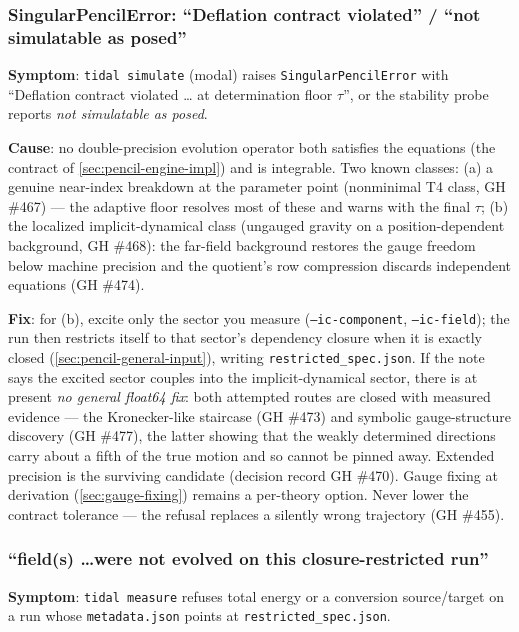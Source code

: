 \subsubsection{SingularPencilError: ``Deflation contract violated'' / ``not simulatable as posed''}
\label{sec:troubleshooting-pencil-refusal}

\textbf{Symptom}: \texttt{tidal simulate} (modal) raises
\texttt{SingularPencilError} with ``Deflation contract violated \ldots
at determination floor $\tau$'', or the stability probe reports
\emph{not simulatable as posed}.

\textbf{Cause}: no double-precision evolution operator both satisfies the
equations (the contract of \cref{sec:pencil-engine-impl}) and is
integrable. Two known classes: (a) a genuine near-index breakdown at the
parameter point (nonminimal T4 class, GH \#467) --- the adaptive floor
resolves most of these and warns with the final $\tau$; (b) the localized
implicit-dynamical class (ungauged gravity on a position-dependent
background, GH \#468): the far-field background restores the gauge
freedom below machine precision and the quotient's row compression
discards independent equations (GH \#474).

\textbf{Fix}: for (b), excite only the sector you measure
(\texttt{--ic-component}, \texttt{--ic-field}); the run then restricts
itself to that sector's dependency closure when it is exactly closed
(\cref{sec:pencil-general-input}), writing \texttt{restricted\_spec.json}.
If the note says the excited sector couples into the implicit-dynamical
sector, there is at present \emph{no general float64 fix}: both attempted
routes are closed with measured evidence --- the Kronecker-like staircase
(GH \#473) and symbolic gauge-structure discovery (GH \#477), the latter
showing that the weakly determined directions carry about a fifth of the
true motion and so cannot be pinned away. Extended precision is the
surviving candidate (decision record GH \#470). Gauge fixing at
derivation (\cref{sec:gauge-fixing}) remains a per-theory option.
Never lower the contract tolerance --- the refusal replaces a silently
wrong trajectory (GH \#455).

\subsubsection{``field(s) \ldots were not evolved on this closure-restricted run''}
\label{sec:troubleshooting-closure-absent}

\textbf{Symptom}: \texttt{tidal measure} refuses total energy or a
conversion source/target on a run whose \texttt{metadata.json} points at
\texttt{restricted\_spec.json}.

